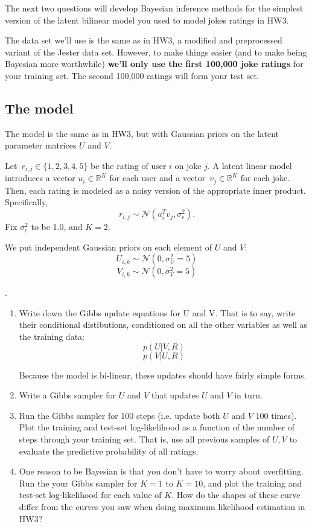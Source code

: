 \documentclass{harvardml}
\newcommand{\R}{\mathbb{R}}
\theoremstyle{plain}
\begin{document}
The next two questions will develop Bayesian inference methods for the simplest version of the latent bilinear model you used to model jokes ratings in HW3.


The data set we'll use is the same as in HW3, a modified and preprocessed variant of the Jester data set.
However, to make things easier (and to make being Bayesian more worthwhile) {\bf we'll only use the first 100,000 joke ratings} for your training set.  The second 100,000 ratings will form your test set.

\subsection*{The model}

The model is the same as in HW3, but with Gaussian priors on the latent parameter matrices $U$ and $V$.

Let~${r_{i,j}\in\{1,2,3,4,5\}}$ be the rating of user $i$ on joke $j$.  A latent linear model introduces a vector ${u_i\in\R^K}$ for each user and a vector~${v_j\in\R^K}$ for each joke.  Then, each rating is modeled as a noisy version of the appropriate inner product. Specifically,
\[
r_{i,j} \sim \mathcal{N}(u_i^T v_j, \sigma_\epsilon^2).
\]
Fix $\sigma_\epsilon^2$ to be 1.0, and $K = 2$.

We put independent Gaussian priors on each element of $U$ and $V$:
\[U_{i,k} \sim \mathcal{N}(0, \sigma_U^2=5)\]
\[V_{i,k} \sim \mathcal{N}(0, \sigma_V^2=5)\]

\begin{problem}

.

\begin{enumerate}

\item Write down the Gibbs update equations for U and V.  That is to say, write their conditional distibutions, conditioned on all the other variables as well as the training data:
%
$$p(U | V, R )$$
$$p(V | U, R )$$

Because the model is bi-linear, these updates should have fairly simple forms.

\item Write a Gibbs sampler for $U$ and $V$ that updates $U$ and $V$ in turn.

\item Run the Gibbs sampler for 100 steps (i.e. update both $U$ and $V$ 100 times).
Plot the training and test-set log-likelihood as a function of the number of steps through your training set.
That is, use all previous samples of $U, V$ to evaluate the predictive probability of all ratings.

\item One reason to be Bayesian is that you don't have to worry about overfitting.
Run the your Gibbs sampler for $K = 1$ to $K = 10$, and plot the training and test-set log-likelihood for each value of $K$.  How do the shapes of these curve differ from the curves you saw when doing maximum likelihood estimation in HW3?


\end{enumerate}
\end{problem}
\end{document}
